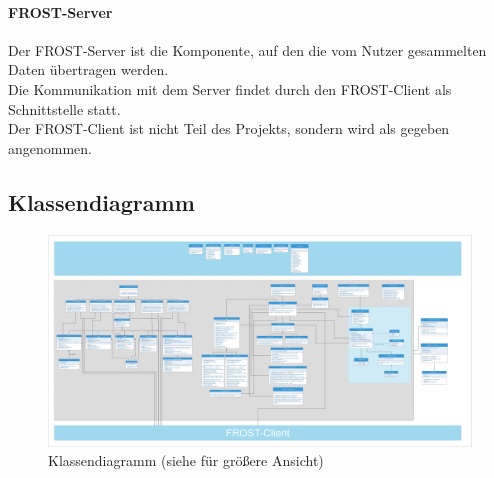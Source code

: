 \paragraph{FROST-Server}
Der FROST-Server ist die Komponente, auf den die vom Nutzer gesammelten Daten übertragen werden.\\
Die Kommunikation mit dem Server findet durch den FROST-Client als Schnittstelle statt.\\
Der FROST-Client ist nicht Teil des Projekts, sondern wird als gegeben angenommen.

\clearpage
\subsection{Klassendiagramm}

\begin{figure}[!h]
\centering
\includegraphics[angle =90, scale=0.13]{Klassendiagramm/klassendiagramm.eps}
\caption{Klassendiagramm (siehe  für größere Ansicht)}
\end{figure}
